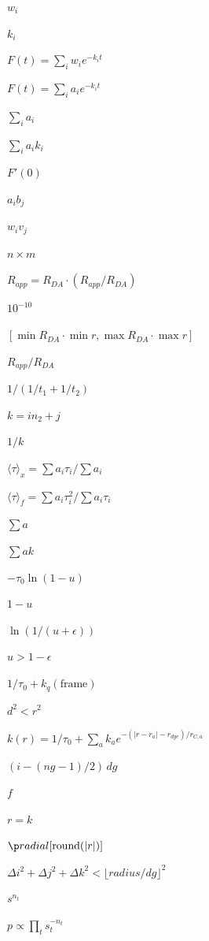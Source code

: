 \documentclass{article}
\begin{document}
$w_i$
\pagebreak

$k_i$
\pagebreak

$F(t) = \sum_i w_i e^{-k_i t}$
\pagebreak

$F(t) = \sum_i a_i e^{-k_i t}$
\pagebreak

$\sum_i a_i$
\pagebreak

$\sum_i a_i k_i$
\pagebreak

$F'(0)$
\pagebreak

$a_i b_j$
\pagebreak

$w_i v_j$
\pagebreak

$n \times m$
\pagebreak

$R_{app} = R_{DA} \cdot (R_{app}/R_{DA})$
\pagebreak

$10^{-10}$
\pagebreak

$[\min R_{DA} \cdot \min r, \max R_{DA} \cdot \max r]$
\pagebreak

$R_{app}/R_{DA}$
\pagebreak

$1/(1/t_1 + 1/t_2)$
\pagebreak

$k = i n_2 + j$
\pagebreak

$1/k$
\pagebreak

$\langle\tau\rangle_x = \sum a_i \tau_i / \sum a_i$
\pagebreak

$\langle\tau\rangle_f = \sum a_i \tau_i^2 / \sum a_i \tau_i$
\pagebreak

$\sum a$
\pagebreak

$\sum a k$
\pagebreak

$-\tau_0 \ln(1-u)$
\pagebreak

$1-u$
\pagebreak

$\ln(1/(u+\epsilon))$
\pagebreak

$u > 1-\epsilon$
\pagebreak

$1/\tau_0 + k_q(\text{frame})$
\pagebreak

$d^2 < r^2$
\pagebreak

$k(r) = 1/\tau_0 + \sum_a k_a e^{-(|r-r_a| - r_{dye})/r_{C,a}}$
\pagebreak

$(i - (ng-1)/2)\,dg$
\pagebreak

$f$
\pagebreak

$r = k$
\pagebreak

$\p radial[\operatorname{round}(|r|)]$
\pagebreak

$\Delta i^2 + \Delta j^2 + \Delta k^2 < \lfloor radius / dg \rfloor^2$
\pagebreak

$s^{n_t}$
\pagebreak

$p \propto \prod_t s_t^{-n_t}$
\pagebreak
\end{document}
